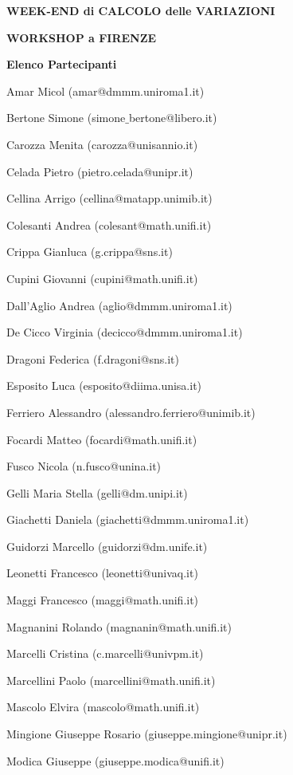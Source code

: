 \documentclass[12pt]{article}
\begin{document}
\centerline{\large{\bf{WEEK-END di CALCOLO delle VARIAZIONI}}}
\vspace*{0.035truein}
\centerline{\large{\bf WORKSHOP a FIRENZE}}
\vspace*{0.035truein}
\centerline{\small{\bf Elenco Partecipanti}}
\vspace*{0.25truein}
%
%


 Amar Micol (amar@dmmm.uniroma1.it)

Bertone Simone (simone$\_$bertone@libero.it)

Carozza Menita (carozza@unisannio.it)

Celada Pietro  (pietro.celada@unipr.it)

Cellina Arrigo  (cellina@matapp.unimib.it)

Colesanti Andrea (colesant@math.unifi.it)

Crippa Gianluca (g.crippa@sns.it)

Cupini Giovanni (cupini@math.unifi.it)

Dall'Aglio Andrea (aglio@dmmm.uniroma1.it)

De Cicco Virginia (decicco@dmmm.uniroma1.it)

Dragoni Federica (f.dragoni@sns.it) 

Esposito Luca  (esposito@diima.unisa.it)

Ferriero Alessandro (alessandro.ferriero@unimib.it)

Focardi Matteo (focardi@math.unifi.it)

Fusco Nicola (n.fusco@unina.it)

Gelli Maria Stella (gelli@dm.unipi.it)

Giachetti Daniela (giachetti@dmmm.uniroma1.it)

Guidorzi Marcello (guidorzi@dm.unife.it)

Leonetti Francesco (leonetti@univaq.it)

Maggi Francesco (maggi@math.unifi.it)

Magnanini Rolando (magnanin@math.unifi.it)

Marcelli Cristina (c.marcelli@univpm.it)

Marcellini Paolo (marcellini@math.unifi.it)

Mascolo Elvira (mascolo@math.unifi.it)

Mingione Giuseppe Rosario (giuseppe.mingione@unipr.it)

Modica Giuseppe (giuseppe.modica@unifi.it)
\end{document}
